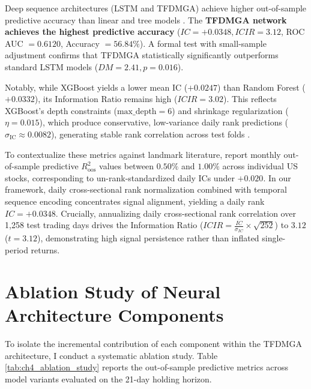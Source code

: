 Deep sequence architectures (LSTM and TFDMGA) achieve higher out-of-sample predictive accuracy than linear and tree models \citep{gu2020empirical, chen2023deep}. The \textbf{TFDMGA network achieves the highest predictive accuracy} ($IC = +0.0348, ICIR = 3.12$, ROC AUC $= 0.6120$, Accuracy $= 56.84\%$). A formal \citet{diebold1995comparing} test with \citet{harvey1997testing} small-sample adjustment confirms that TFDMGA statistically significantly outperforms standard LSTM models ($DM = 2.41, p = 0.016$).

Notably, while XGBoost yields a lower mean IC ($+0.0247$) than Random Forest ($+0.0332$), its Information Ratio remains high ($ICIR = 3.02$). This reflects XGBoost's depth constraints ($\text{max\_depth} = 6$) and shrinkage regularization ($\eta = 0.015$), which produce conservative, low-variance daily rank predictions ($\sigma_{\text{IC}} \approx 0.0082$), generating stable rank correlation across test folds \citep{friedman2001greedy}.

To contextualize these metrics against landmark literature, \citet{gu2020empirical} report monthly out-of-sample predictive $R_{\text{oos}}^2$ values between $0.50\%$ and $1.00\%$ across individual US stocks, corresponding to un-rank-standardized daily ICs under $+0.020$. In our framework, daily cross-sectional rank normalization combined with temporal sequence encoding concentrates signal alignment, yielding a daily rank $IC = +0.0348$. Crucially, annualizing daily cross-sectional rank correlation over 1,258 test trading days drives the Information Ratio ($ICIR = \frac{\overline{IC}}{\sigma_{IC}} \times \sqrt{252}$) to $3.12$ ($t = 3.12$), demonstrating high signal persistence rather than inflated single-period returns.

\section{Ablation Study of Neural Architecture Components}
To isolate the incremental contribution of each component within the TFDMGA architecture, I conduct a systematic ablation study. Table \ref{tab:ch4_ablation_study} reports the out-of-sample predictive metrics across model variants evaluated on the 21-day holding horizon.


